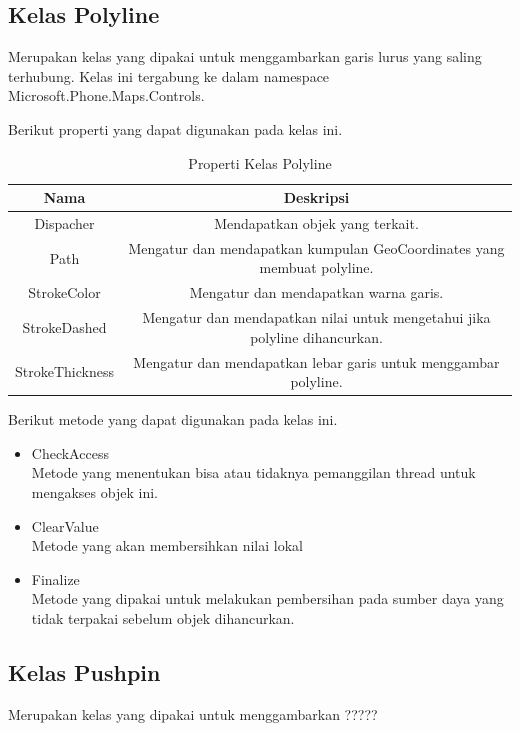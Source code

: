 \subsection{Kelas Polyline}
\label{subsec:Kelas Polyline}
\hspace{0.5cm} Merupakan kelas yang dipakai untuk menggambarkan garis lurus yang saling terhubung. Kelas ini tergabung ke dalam namespace  Microsoft.Phone.Maps.Controls. 

Berikut properti yang dapat digunakan pada kelas ini.
\begin{table}[h]
	\centering
		\begin{tabular}{ |c||c|}
				\hline
					Nama & Deskripsi \\ \hline
					Dispacher & Mendapatkan objek yang terkait. \\ \hline
					Path & Mengatur dan mendapatkan kumpulan GeoCoordinates yang membuat polyline. \\ \hline
					StrokeColor & Mengatur dan mendapatkan warna garis. \\ \hline
					StrokeDashed & Mengatur dan mendapatkan nilai untuk mengetahui jika polyline dihancurkan. \\ \hline
					StrokeThickness & Mengatur dan mendapatkan lebar garis untuk menggambar polyline. \\ \hline
				\hline
		\end{tabular}
	\caption{Properti Kelas Polyline}
	\label{tab:PropertiKelasPolyline}
\end{table}

Berikut metode yang dapat digunakan pada kelas ini.
\begin{itemize}
	\item CheckAccess\\
	Metode yang menentukan bisa atau tidaknya pemanggilan thread untuk mengakses objek ini.
	\item ClearValue\\
	Metode yang akan membersihkan nilai lokal
	\item Finalize \\
	Metode yang dipakai untuk melakukan pembersihan pada sumber daya yang tidak terpakai sebelum objek dihancurkan.
\end{itemize}

\subsection{Kelas Pushpin}
\label{subsec:Kelas Pushpin}
\hspace{0.5cm} Merupakan kelas yang dipakai untuk menggambarkan ?????

